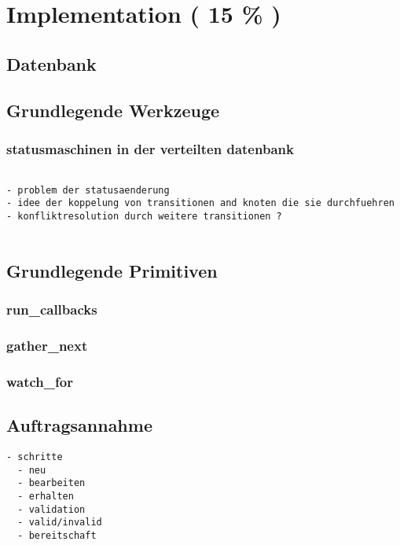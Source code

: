 \chapter{Implementation ( 15 \% ) }



\section{Datenbank}
\section{Grundlegende Werkzeuge}
\subsection{statusmaschinen in der verteilten datenbank}

\begin{verbatim}

- problem der statusaenderung
- idee der koppelung von transitionen and knoten die sie durchfuehren
- konfliktresolution durch weitere transitionen ?


\end{verbatim}
\section{Grundlegende Primitiven}

\subsection{run\_callbacks}
\subsection{gather\_next}
\subsection{watch\_for}

\section{Auftragsannahme}

\begin{verbatim}
- schritte
  - neu
  - bearbeiten
  - erhalten
  - validation
  - valid/invalid
  - bereitschaft
\end{verbatim}

